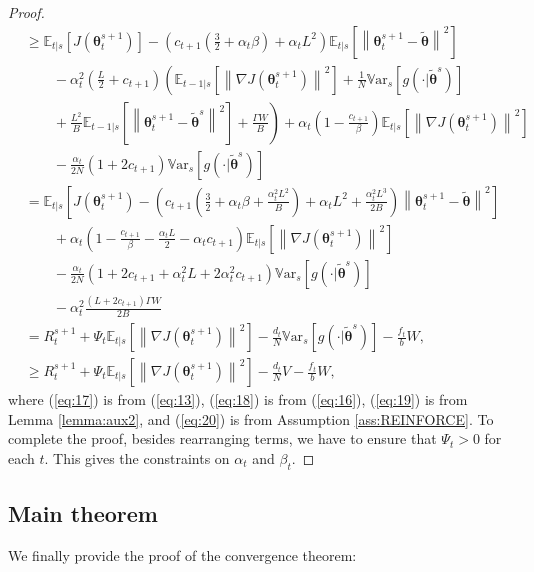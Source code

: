 \documentclass{article}
\theoremstyle{remark}
\theoremstyle{definition}
\newcommand{\norm}[2][\infty]{\left\|#2\right\|_{#1}}
\newcommand{\vtheta}{\boldsymbol{\theta}}
\newcommand{\gradJ}[1]{\nabla J(#1)}
\newcommand{\Ets}[2][t]{\mathbb{E}_{#1\vert s}\left[#2\right]}
\newcommand{\Vars}[1]{{\mathbb{V}\text{ar}}_{s}\left[#1\right]}
\newcommand{\VARRF}{V}
\newcommand{\VARIS}{W}
\begin{document}
\begin{proof}
\begin{align}
	&\geq  \Ets{J(\vtheta_t^{s+1})} - \left(c_{t+1}\left(\frac{3}{2}+\alpha_t\beta\right)+\alpha_tL^2\right)\Ets{\norm[]{\vtheta_{t}^{s+1}-\tilde{\vtheta}}^2} \nonumber\\
	&\qquad
	-\alpha_t^2\left(\frac{L}{2}+c_{t+1}\right)\left(\Ets[t-1]{\norm[]{\gradJ{\vtheta_t^{s+1}}}^2} 
	+\frac{1}{N}\Vars{g(\cdot\vert\tilde{\vtheta}^s)}
	\right.\nonumber\\
	&\left.\qquad+\frac{L^2}{B}\Ets[t-1]{\norm[]{\vtheta_t^{s+1}-\tilde{\vtheta}^s}^2}
	+\frac{\Gamma W}{B}\right)
	+\alpha_t\left(1-\frac{c_{t+1}}{\beta}\right)\Ets{\norm[]{\gradJ{\vtheta_t^{s+1}}}^2} \nonumber\\
	&\qquad-\frac{\alpha_t}{2N}\left(1+2c_{t+1}\right)\Vars{g(\cdot\vert\tilde{\vtheta}^s)} \label{eq:19}\\
	& = \Ets{J(\vtheta_t^{s+1}) - \left(c_{t+1}\left(\frac{3}{2}+\alpha_t\beta+\frac{\alpha_t^2L^2}{B}\right)+\alpha_tL^2+\frac{\alpha_t^2L^3}{2B}\right)\norm[]{\vtheta_{t}^{s+1}-\tilde{\vtheta}}^2} \nonumber\\
	&\qquad
	+\alpha_t\left(1-\frac{c_{t+1}}{\beta}-\frac{\alpha_tL}{2}-\alpha_tc_{t+1}\right)\Ets{\norm[]{\gradJ{\vtheta_t^{s+1}}}^2} \nonumber\\
	&\qquad-\frac{\alpha_t}{2N}\left(1+2c_{t+1}+\alpha_t^2L+2\alpha_t^2c_{t+1}\right)\Vars{g(\cdot\vert\tilde{\vtheta}^s)} \nonumber\\
	&\qquad-\alpha_t^2\frac{(L+2c_{t+1})\Gamma\VARIS}{2B} \nonumber\\
	&= R_t^{s+1}
	+\Psi_t\Ets{\norm[]{\gradJ{\vtheta_t^{s+1}}}^2}
	-\frac{d_t}{N}\Vars{g(\cdot\vert\tilde{\vtheta}^s)}
	-\frac{f_t}{b}\VARIS,\nonumber\\
	&\geq R_t^{s+1}
	+\Psi_t\Ets{\norm[]{\gradJ{\vtheta_t^{s+1}}}^2}
	-\frac{d_t}{N}\VARRF
	-\frac{f_t}{b}\VARIS, \label{eq:20}
\end{align}
where (\ref{eq:17}) is from (\ref{eq:13}), (\ref{eq:18}) is from (\ref{eq:16}), (\ref{eq:19}) is from Lemma \ref{lemma:aux2}, and (\ref{eq:20}) is from Assumption \ref{ass:REINFORCE}.
To complete the proof, besides rearranging terms, we have to ensure that $\Psi_t>0$ for each $t$. This gives the constraints on $\alpha_t$ and $\beta_t$.
\end{proof}


\subsection*{Main theorem}
We finally provide the proof of the convergence theorem:
\end{document}
